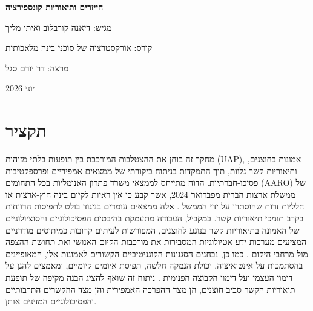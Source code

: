 \documentclass[12pt,a4paper]{article}
\begin{document}
\begin{titlepage}
\centering
\vspace*{3cm}
{\Huge\bfseries חייזרים ותיאוריות קונספירציה\par}
\vspace{2cm}
{\Large מגיש: דיאנה קורבלוב ואיתי מליך\par}
\vspace{1cm}
{\large קורס: אורקסטרציה של סוכני בינה מלאכותית\par}
{\large מרצה: דר יורם סגל\par}
\vfill
{\large יוני 2026\par}
\end{titlepage}
\newpage
\section*{תקציר}

מחקר זה בוחן את ההצטלבות המורכבת בין תופעות בלתי מזוהות (UAP), אמונות בחוצנים, ותיאוריות קשר נלוות, תוך התמקדות בניתוח ביקורתי של ממצאים אמפיריים ופרספקטיבות פסיכו-חברתיות. הדוח מתייחס לממצאי משרד פתרון האנומליות בכל התחומים (AARO) של ממשלת ארצות הברית מפברואר 2024, אשר קבע כי אין ראיות לקיום בינה חוץ-ארצית או חלליות זרות שהוסתרו על ידי הממשל \cite{1, 2, 6}. אלה ממצאים עומדים בניגוד בולט לתפיסות הרווחות בקרב תומכי תיאוריות קשר. במקביל, העבודה מתעמקת בהיבטים הפסיכולוגיים והסוציולוגיים של האמונה בתיאוריות קשר בנוגע לחוצנים, המפורשות לעיתים קרובות כמיתוסים מודרניים המציעים מערכות ידע אטיולוגיות המסבירות את מורכבות הקיום האנושי ואת תחושת ההצפה מול מרחבי היקום \cite{3}. כמו כן, נבחנים הסגנונות הקוגניטיביים הקשורים לאמונות אלו, המאופיינים בהסתמכות על אינטואיציה, יכולת הנמקה חלשה, תפיסת איומים קיומיים, ומאמצים להגן על דימוי העצמי ועל דימוי הקבוצה הפנימית \cite{4}. ניתוח זה שואף להציג הבנה מקיפה של תופעת תיאוריות הקשר סביב חוצנים, הן מצד ההפרכה האמפירית והן מצד ההקשרים התרבותיים והפסיכולוגיים המזינים אותן.
\end{document}
